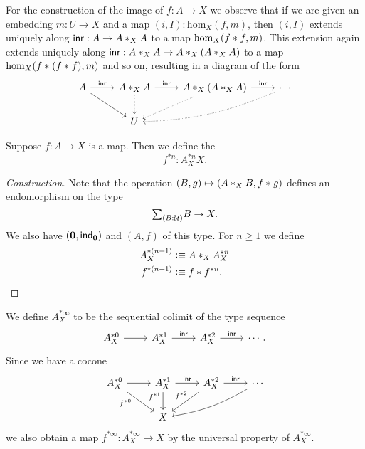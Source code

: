 For the construction of the image of $f:A\to X$ we observe that if we are given an embedding $m:U\to X$ and a map $(i,I):\mathrm{hom}_X(f,m)$, then $(i,I)$ extends uniquely along $\inr:A\to \join[X]{A}{A}$ to a map $\mathrm{hom}_X(\join{f}{f},m)$. This extension again extends uniquely along $\inr:\join[X]{A}{A}\to \join[X]{A}{(\join[X]{A}{A})}$ to a map $\mathrm{hom}_X(\join{f}{(\join{f}{f})},m)$ and so on, resulting in a diagram of the form
\begin{equation*}
\begin{tikzcd}
A \arrow[dr] \arrow[r,"\inr"] & \join[X]{A}{A} \arrow[d,densely dotted] \arrow[r,"\inr"] & \join[X]{A}{(\join[X]{A}{A})} \arrow[dl,densely dotted] \arrow[r,"\inr"] & \cdots \arrow[dll,densely dotted,bend left=10] \\
& U
\end{tikzcd}
\end{equation*}

\begin{defn}
Suppose $f:A\to X$ is a map. Then we define the  
\begin{equation*}
f^{\ast n}:A_X^{\ast n} X.
\end{equation*}
\end{defn}

\begin{proof}[Construction]
Note that the operation $(B,g)\mapsto (\join[X]{A}{B},\join{f}{g})$ defines an endomorphism on the type
\begin{equation*}
\sm{B:\UU}B\to X.
\end{equation*}
We also have $(\emptyt,\ind{\emptyt})$ and $(A,f)$ of this type. For $n\geq 1$ we define
\begin{align*}
A_X^{\ast (n+1)} & \defeq \join[X]{A}{A_X^{\ast n}} \\
f^{\ast (n+1)} & \defeq \join{f}{f^{\ast n}}.\qedhere
\end{align*}
\end{proof}

\begin{defn}
We define $A_X^{\ast\infty}$ to be the sequential colimit of the type sequence
\begin{equation*}
\begin{tikzcd}
A_X^{\ast 0} \arrow[r] & A_X^{\ast 1} \arrow[r,"\inr"] & A_X^{\ast 2} \arrow[r,"\inr"] & \cdots.
\end{tikzcd}
\end{equation*}
Since we have a cocone
\begin{equation*}
\begin{tikzcd}
A_X^{\ast 0} \arrow[r] \arrow[dr,swap,"f^{\ast 0}" near start] & A_X^{\ast 1} \arrow[r,"\inr"] \arrow[d,swap,"f^{\ast 1}" near start] & A_X^{\ast 2} \arrow[r,"\inr"] \arrow[dl,swap,"f^{\ast 2}" xshift=1ex] & \cdots \arrow[dll,bend left=10] \\
& X
\end{tikzcd}
\end{equation*}
we also obtain a map $f^{\ast\infty}:A_X^{\ast\infty}\to X$ by the universal property of $A_X^{\ast\infty}$. 
\end{defn}

